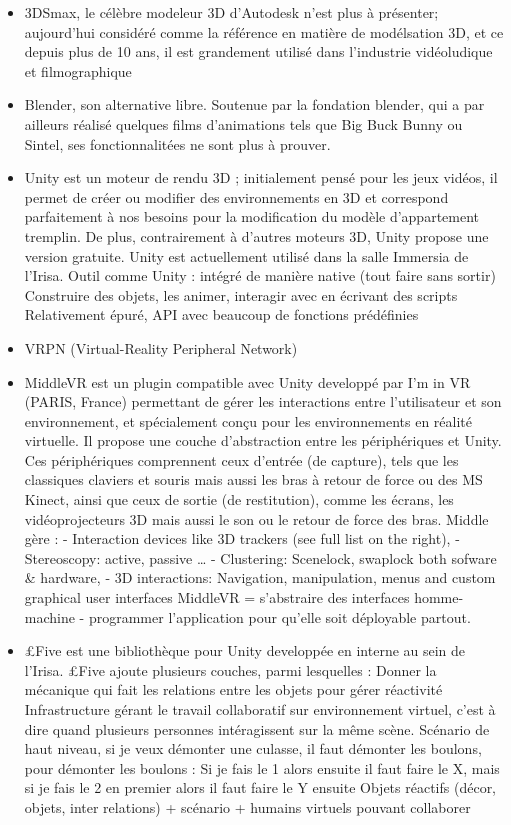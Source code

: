 	\begin{itemize}
		\item 3DSmax, le célèbre modeleur 3D d'Autodesk n'est plus à présenter; aujourd'hui considéré comme la référence en matière de modélsation 3D, et ce depuis plus de 10 ans, il est grandement utilisé dans l'industrie vidéoludique et filmographique
		\item Blender, son alternative libre. Soutenue par la fondation blender, qui a par ailleurs réalisé quelques films d'animations tels que Big Buck Bunny ou Sintel, ses fonctionnalitées ne sont plus à prouver.
		\item Unity est un moteur de rendu 3D ; initialement pensé pour les jeux vidéos, il permet de créer ou modifier des environnements en 3D et correspond parfaitement à nos besoins pour la modification du modèle d'appartement tremplin. De plus, contrairement à d'autres moteurs 3D, Unity propose une version gratuite. Unity est actuellement utilisé dans la salle Immersia de l'Irisa.      
			Outil comme Unity : intégré de manière native (tout faire sans sortir)
			Construire des objets, les animer, interagir avec en écrivant des scripts
			Relativement épuré, API avec beaucoup de fonctions prédéfinies


		\item VRPN (Virtual-Reality Peripheral Network)
		
		\item MiddleVR est un plugin compatible avec Unity developpé par I'm in VR (PARIS, France) permettant de gérer les interactions entre l'utilisateur et son environnement, et spécialement conçu pour les environnements en réalité virtuelle. Il propose une couche d'abstraction entre les périphériques et Unity. Ces périphériques comprennent ceux d'entrée (de capture), tels que les classiques claviers et souris mais aussi les bras à retour de force ou des MS Kinect, ainsi que ceux de sortie (de restitution), comme les écrans, les vidéoprojecteurs 3D mais aussi le son ou le retour de force des bras. Middle gère :
		- Interaction devices like 3D trackers (see full list on the right),
		- Stereoscopy: active, passive …
		- Clustering: Scenelock, swaplock both sofware \& hardware,
		- 3D interactions: Navigation, manipulation, menus and custom graphical user interfaces
		MiddleVR = s'abstraire des interfaces homme-machine - programmer l'application pour qu'elle soit déployable partout.

		\item {\pounds}Five est une bibliothèque pour Unity developpée en interne au sein de l'Irisa. {\pounds}Five ajoute plusieurs couches, parmi lesquelles : 
		Donner la mécanique qui fait les relations entre les objets pour gérer réactivité
		Infrastructure gérant le travail collaboratif sur environnement virtuel, c'est à dire quand plusieurs personnes intéragissent sur la même scène.
		Scénario de haut niveau, si je veux démonter une culasse, il faut démonter les boulons, pour démonter les boulons : Si je fais le 1 alors ensuite il faut faire le X, mais si je fais le 2 en premier alors il faut faire le Y ensuite
		Objets réactifs (décor, objets, inter relations) + scénario + humains virtuels pouvant collaborer
	\end{itemize}

